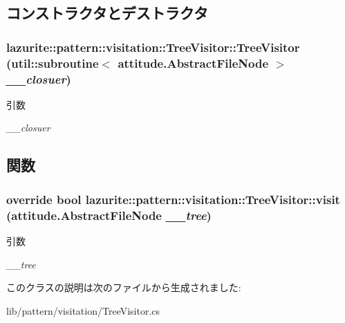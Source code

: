 \subsection{コンストラクタとデストラクタ}
\hypertarget{classlazurite_1_1pattern_1_1visitation_1_1_tree_visitor_af4221b6b7a2b34783cfe8a8b2d24cd1e}{
\subsubsection[{TreeVisitor}]{\setlength{\rightskip}{0pt plus 5cm}lazurite::pattern::visitation::TreeVisitor::TreeVisitor (util::subroutine$<$ {\bf attitude.AbstractFileNode} $>$ {\em \_\-\_\-closuer})}}
\label{classlazurite_1_1pattern_1_1visitation_1_1_tree_visitor_af4221b6b7a2b34783cfe8a8b2d24cd1e}

\begin{DoxyParams}{引数}
\item[{\em \_\-\_\-closuer}]\end{DoxyParams}


\subsection{関数}
\hypertarget{classlazurite_1_1pattern_1_1visitation_1_1_tree_visitor_abbb8b6183f27e54acb7eef607361c567}{
\subsubsection[{visit}]{\setlength{\rightskip}{0pt plus 5cm}override bool lazurite::pattern::visitation::TreeVisitor::visit ({\bf attitude.AbstractFileNode} {\em \_\-\_\-tree})}}
\label{classlazurite_1_1pattern_1_1visitation_1_1_tree_visitor_abbb8b6183f27e54acb7eef607361c567}

\begin{DoxyParams}{引数}
\item[{\em \_\-\_\-tree}]\end{DoxyParams}


このクラスの説明は次のファイルから生成されました:\begin{DoxyCompactItemize}
\item 
lib/pattern/visitation/TreeVisitor.cs\end{DoxyCompactItemize}
